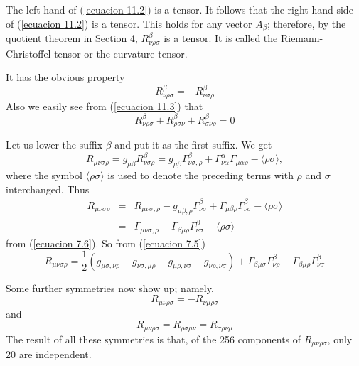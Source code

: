 The left hand of (\ref{ecuacion 11.2}) is a tensor. It follows that the 
right-hand side of (\ref{ecuacion 11.2}) is a tensor. This holds for any vector 
$A_{\beta}$; therefore, by the quotient theorem in Section 4, 
$R^{\beta}_{\nu\rho\sigma}$ is a tensor. It is called the Riemann-Christoffel 
tensor or the curvature tensor.

It has the obvious property 
\begin{equation}
 \label{ecuacion 11.4}
 R^{\beta}_{\nu\rho\sigma} = - R^{\beta}_{\nu\sigma\rho}
\end{equation}
Also we easily see from (\ref{ecuacion 11.3}) that
\begin{equation}
 \label{ecuacion 11.5}
   R^{\beta}_{\nu\rho\sigma} 
 + R^{\beta}_{\rho\sigma\nu} 
 + R^{\beta}_{\sigma\nu\rho} = 0
\end{equation}

Let us lower the suffix $\beta$ and put it as the first suffix. We get
\[
 R_{\mu\nu\sigma\rho} = g_{\mu\beta} R^{\beta}_{\nu\sigma\rho} =
 g_{\mu\beta} \Gamma^{\beta}_{\nu\sigma,\rho} 
 + \Gamma^{\alpha}_{\nu\alpha} \Gamma_{\mu\alpha\rho} - \langle \rho\sigma 
\rangle,
\]
where the symbol $\langle \rho \sigma \rangle$ is used to denote the preceding 
terms with $\rho$ and $\sigma$ interchanged. Thus
\[
 \begin{array}{rcl}
  R_{\mu\nu\sigma\rho} & = & R_{\mu\nu\sigma,\rho} - 
g_{\mu\beta,\rho}\Gamma^{\beta}_{\nu\sigma} + 
\Gamma_{\mu\beta\rho}\Gamma^{\beta}_{\nu\sigma} - \langle \rho\sigma \rangle \\
& = & \Gamma_{\mu\nu\sigma,\rho} - 
\Gamma_{\beta\mu\rho}\Gamma^{\beta}_{\nu\sigma} - \langle \rho\sigma \rangle
 \end{array}
\]
from (\ref{ecuacion 7.6}). So from (\ref{ecuacion 7.5})
\begin{equation}
 \label{ecuacion 11.6}
 R_{\mu\nu\sigma\rho} = \frac{1}{2}
 \left(
       g_{\mu\sigma,\nu\rho} 
     - g_{\nu\sigma,\mu\rho} 
     - g_{\mu\rho,\nu\sigma}
     - g_{\nu\rho,\nu\sigma}
 \right)
 + \Gamma_{\beta\mu\sigma}\Gamma^{\beta}_{\nu\rho}
 - \Gamma_{\beta\mu\rho}\Gamma^{\beta}_{\nu\sigma}
\end{equation}

Some further symmetries now show up; namely,
\begin{equation}
 \label{ecuacion 11.7}
 R_{\mu\nu\rho\sigma} = - R_{\nu\mu\rho\sigma}
\end{equation}
and
\begin{equation}
 \label{ecuacion 11.8}
 R_{\mu\nu\rho\sigma} = R_{\rho\sigma\mu\nu} = R_{\sigma\rho\nu\mu}
\end{equation}
The result of all these symmetries is that, of the 256 components of 
$R_{\mu\nu\rho\sigma}$, only 20 are independent.


